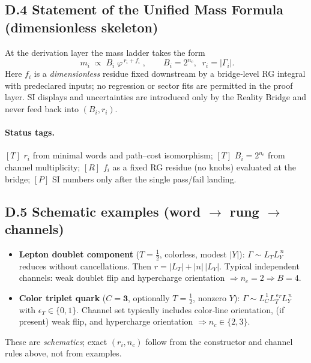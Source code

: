 \documentclass[11pt]{article}
\begin{document}
\begin{proposition}
\subsection*{D.4  Statement of the Unified Mass Formula (dimensionless skeleton)}
At the derivation layer the mass ladder takes the form
\[
\boxed{\;
m_i \;\propto\; B_i \;\varphi^{\,r_i + f_i}\;},
\qquad
B_i=2^{n_c},\;\; r_i=|\Gamma_i|.
\]
Here \(f_i\) is a \emph{dimensionless} residue fixed downstream by a bridge‑level RG integral with predeclared inputs; no regression or sector fits are permitted in the proof layer. SI displays and uncertainties are introduced only by the Reality Bridge and never feed back into \((B_i,r_i)\).%

\paragraph{Status tags.}
\([T]\) \(r_i\) from minimal words and path–cost isomorphism; \([T]\) \(B_i=2^{n_c}\) from channel multiplicity; \([R]\) \(f_i\) as a fixed RG residue (no knobs) evaluated at the bridge; \([P]\) SI numbers only after the single pass/fail landing.%

\subsection*{D.5  Schematic examples (word \(\to\) rung \(\to\) channels)}
\begin{itemize}
\item \textbf{Lepton doublet component} (\(T=\tfrac12\), colorless, modest \(|Y|\)): \(\Gamma\sim L_T L_Y^{\,n}\) reduces without cancellations. Then \(r=|L_T|+|n|\,|L_Y|\). Typical independent channels: weak doublet flip and hypercharge orientation \(\Rightarrow n_c=2 \Rightarrow B=4\).
\item \textbf{Color triplet quark} (\(C=\mathbf3\), optionally \(T=\tfrac12\), nonzero \(Y\)): \(\Gamma\sim L_C^{\,1} L_T^{\,\epsilon_T} L_Y^{\,n}\) with \(\epsilon_T\in\{0,1\}\). Channel set typically includes color‑line orientation, (if present) weak flip, and hypercharge orientation \(\Rightarrow n_c\in\{2,3\}\).
\end{itemize}
These are \emph{schematics}; exact \((r_i,n_c)\) follow from the constructor and channel rules above, not from examples.


\end{proposition}
\end{document}
